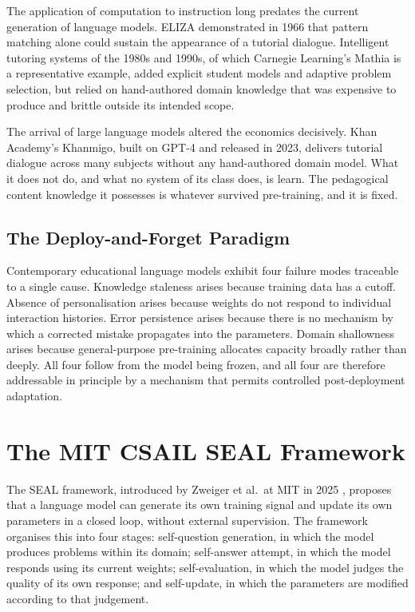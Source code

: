 \documentclass[12pt,a4paper]{report}
\begin{document}
The application of computation to instruction long predates the current generation of language models. ELIZA demonstrated in 1966 that pattern matching alone could sustain the appearance of a tutorial dialogue. Intelligent tutoring systems of the 1980s and 1990s, of which Carnegie Learning's Mathia is a representative example, added explicit student models and adaptive problem selection, but relied on hand-authored domain knowledge that was expensive to produce and brittle outside its intended scope.

The arrival of large language models altered the economics decisively. Khan Academy's Khanmigo, built on GPT-4 and released in 2023, delivers tutorial dialogue across many subjects without any hand-authored domain model. What it does not do, and what no system of its class does, is learn. The pedagogical content knowledge it possesses is whatever survived pre-training, and it is fixed.

\subsection{The Deploy-and-Forget Paradigm}

Contemporary educational language models exhibit four failure modes traceable to a single cause. Knowledge staleness arises because training data has a cutoff. Absence of personalisation arises because weights do not respond to individual interaction histories. Error persistence arises because there is no mechanism by which a corrected mistake propagates into the parameters. Domain shallowness arises because general-purpose pre-training allocates capacity broadly rather than deeply. All four follow from the model being frozen, and all four are therefore addressable in principle by a mechanism that permits controlled post-deployment adaptation.

\section{The MIT CSAIL SEAL Framework}

The SEAL framework, introduced by Zweiger et al.~at MIT in 2025 \cite{mitseal}, proposes that a language model can generate its own training signal and update its own parameters in a closed loop, without external supervision. The framework organises this into four stages: self-question generation, in which the model produces problems within its domain; self-answer attempt, in which the model responds using its current weights; self-evaluation, in which the model judges the quality of its own response; and self-update, in which the parameters are modified according to that judgement.
\end{document}
